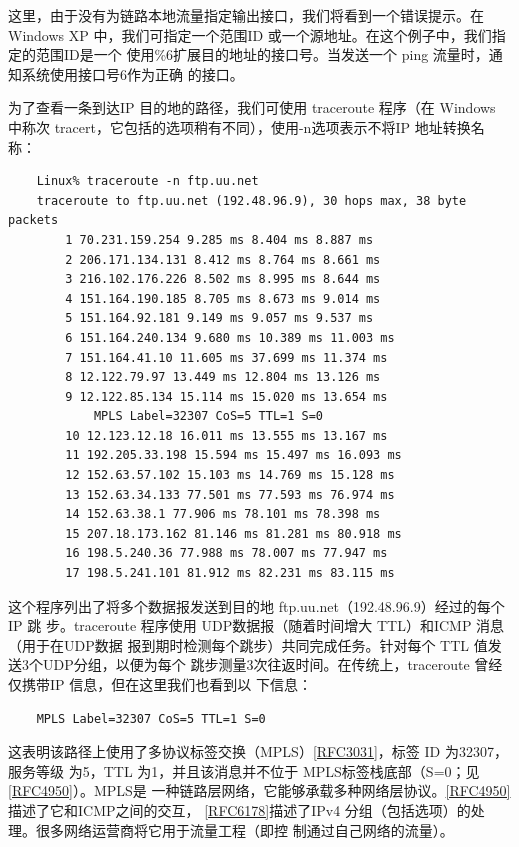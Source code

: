 这里，由于没有为链路本地流量指定输出接口，我们将看到一个错误提示。在 Windows
XP 中，我们可指定一个范围ID 或一个源地址。在这个例子中，我们指定的范围ID是一个
使用\%6扩展目的地址的接口号。当发送一个 ping 流量时，通知系统使用接口号6作为正确
的接口。

为了查看一条到达IP 目的地的路径，我们可使用 traceroute 程序（在 Windows 中称次
tracert，它包括的选项稍有不同），使用-n选项表示不将IP 地址转换名称：

\begin{verbatim}
    Linux% traceroute -n ftp.uu.net
    traceroute to ftp.uu.net (192.48.96.9), 30 hops max, 38 byte packets
        1 70.231.159.254 9.285 ms 8.404 ms 8.887 ms
        2 206.171.134.131 8.412 ms 8.764 ms 8.661 ms
        3 216.102.176.226 8.502 ms 8.995 ms 8.644 ms
        4 151.164.190.185 8.705 ms 8.673 ms 9.014 ms
        5 151.164.92.181 9.149 ms 9.057 ms 9.537 ms
        6 151.164.240.134 9.680 ms 10.389 ms 11.003 ms
        7 151.164.41.10 11.605 ms 37.699 ms 11.374 ms
        8 12.122.79.97 13.449 ms 12.804 ms 13.126 ms
        9 12.122.85.134 15.114 ms 15.020 ms 13.654 ms
            MPLS Label=32307 CoS=5 TTL=1 S=0
        10 12.123.12.18 16.011 ms 13.555 ms 13.167 ms
        11 192.205.33.198 15.594 ms 15.497 ms 16.093 ms
        12 152.63.57.102 15.103 ms 14.769 ms 15.128 ms
        13 152.63.34.133 77.501 ms 77.593 ms 76.974 ms
        14 152.63.38.1 77.906 ms 78.101 ms 78.398 ms
        15 207.18.173.162 81.146 ms 81.281 ms 80.918 ms
        16 198.5.240.36 77.988 ms 78.007 ms 77.947 ms
        17 198.5.241.101 81.912 ms 82.231 ms 83.115 ms
\end{verbatim}

这个程序列出了将多个数据报发送到目的地 ftp.uu.net（192.48.96.9）经过的每个IP 跳
步。traceroute 程序使用 UDP数据报（随着时间增大 TTL）和ICMP 消息（用于在UDP数据
报到期时检测每个跳步）共同完成任务。针对每个 TTL 值发送3个UDP分组，以便为每个
跳步测量3次往返时间。在传统上，traceroute 曾经仅携带IP 信息，但在这里我们也看到以
下信息：

\begin{verbatim}
    MPLS Label=32307 CoS=5 TTL=1 S=0
\end{verbatim}

这表明该路径上使用了多协议标签交换（MPLS）\href{https://www.rfc-editor.org/rfc/rfc3031}{[RFC3031]}，标签
ID 为32307，服务等级
为5，TTL 为1，并且该消息并不位于
MPLS标签栈底部（S=0；见\href{https://www.rfc-editor.org/rfc/rfc4950}{[RFC4950]}）。MPLS是
一种链路层网络，它能够承载多种网络层协议。\href{https://www.rfc-editor.org/rfc/rfc4950}{[RFC4950]}描述了它和ICMP之间的交互，
\href{https://www.rfc-editor.org/rfc/rfc6178}{[RFC6178]}描述了IPv4
分组（包括选项）的处理。很多网络运营商将它用于流量工程（即控
制通过自己网络的流量）。

